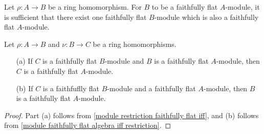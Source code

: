 \begin{corollary}\label{module faithfully flat algebra iff restriction}
Let $\rho:A\to B$ be a ring homomorphism. For $B$ to be a faithfully flat $A$-module, it is sufficient that there exist one faithfully flat $B$-module which is also a faithfully flat $A$-module.
\end{corollary}
\begin{corollary}\label{module faithfully flat algebra transitivity}
Let $\rho:A\to B$ and $\nu:B\to C$ be a ring homomorphisms.
\begin{itemize}
\item[(a)] If $C$ is a faithfully flat $B$-module and $B$ is a faithfully flat $A$-module, then $C$ is a faithfully flat $A$-module.
\item[(b)] If $C$ is a faithfuflly flat $B$-module and a faithfully flat $A$-module, then $B$ is a faithfully flat $A$-module.
\end{itemize}
\end{corollary}
\begin{proof}
Part (a) follows from \cref{module restriction faithfully flat iff}, and (b) follows from \cref{module faithfully flat algebra iff restriction}.
\end{proof}
